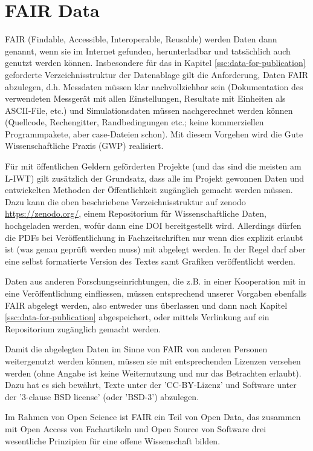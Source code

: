 \section{FAIR Data}\label{ssc:FAIR-Data}

FAIR (Findable, Accessible, Interoperable, Reusable) werden Daten dann genannt, wenn sie im Internet gefunden, herunterladbar und tatsächlich auch genutzt werden können. Insbesondere für das in Kapitel \ref{ssc:data-for-publication} geforderte Verzeichnisstruktur der Datenablage gilt die Anforderung, Daten FAIR abzulegen, d.h. Messdaten müssen klar nachvollziehbar sein (Dokumentation des verwendeten Messgerät mit allen Einstellungen, Resultate mit Einheiten als ASCII-File, etc.) und Simulationsdaten müssen nachgerechnet werden können (Quellcode, Rechengitter, Randbedingungen etc.; keine kommerziellen Programmpakete, aber case-Dateien schon). Mit diesem Vorgehen wird die Gute Wissenschaftliche Praxis (GWP) realisiert.

Für mit öffentlichen Geldern geförderten Projekte (und das sind die meisten am L-IWT) gilt zusätzlich der Grundsatz, dass alle im Projekt gewonnen Daten und entwickelten Methoden der Öffentlichkeit zugänglich gemacht werden müssen. Dazu kann die oben beschriebene Verzeichnisstruktur auf zenodo \url{https://zenodo.org/}, einem Repositorium für Wissenschaftliche Daten, hochgeladen werden, wofür dann eine DOI bereitgestellt wird. Allerdings dürfen die PDFs bei Veröffentlichung in Fachzeitschriften nur wenn dies explizit erlaubt ist (was genau geprüft werden muss) mit abgelegt werden. In der Regel darf aber eine selbst formatierte Version des Textes samt Grafiken veröffentlicht werden.

Daten aus anderen Forschungseinrichtungen, die z.B. in einer Kooperation mit in eine Veröffentlichung einfliessen, müssen entsprechend unserer Vorgaben ebenfalls FAIR abgelegt werden, also entweder uns überlassen und dann nach Kapitel \ref{ssc:data-for-publication} abgespeichert, oder mittels Verlinkung auf ein Repositorium zugänglich gemacht werden.

Damit die abgelegten Daten im Sinne von FAIR von anderen Personen weitergenutzt werden können, müssen sie mit entsprechenden Lizenzen versehen werden (ohne Angabe ist keine Weiternutzung und nur das Betrachten erlaubt).
Dazu hat es sich bewährt, Texte unter der 'CC-BY-Lizenz' und Software unter der '3-clause BSD license' (oder 'BSD-3') abzulegen.

Im Rahmen von Open Science ist FAIR ein Teil von Open Data, das zusammen mit Open Access von Fachartikeln und Open Source von Software drei wesentliche Prinzipien für eine offene Wissenschaft bilden.
